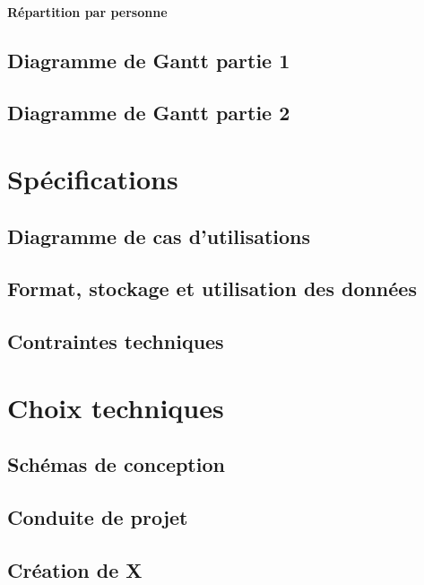 \documentclass[
	headsepline=on,
	footsepline=on,
	twoside=off,
	abstract=on,
	DIV=10
]{scrreprt}
\begin{document}
			\paragraph{Répartition par personne}
		
			\subsection{Diagramme de Gantt partie 1}
			
			\subsection{Diagramme de Gantt partie 2}
		\section{Spécifications}
			\subsection{Diagramme de cas d'utilisations}
			
			\subsection{Format, stockage et utilisation des données}
			
			\subsection{Contraintes techniques}
		
		\section{Choix techniques}
			\subsection{Schémas de conception}
			
			\subsection{Conduite de projet}
			
			\subsection{Création de X}
			
\end{document}
